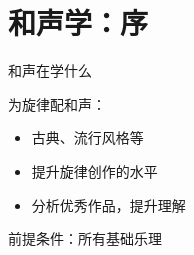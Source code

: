 \section{和声学：序}%
\label{sec:和声学：序}
\begin{question}
    和声在学什么
\end{question}
为旋律配和声：
\begin{itemize}
    \item 古典、流行风格等
    \item 提升旋律创作的水平
    \item 分析优秀作品，提升理解
\end{itemize}
\begin{notation}
    前提条件：所有基础乐理
\end{notation}
